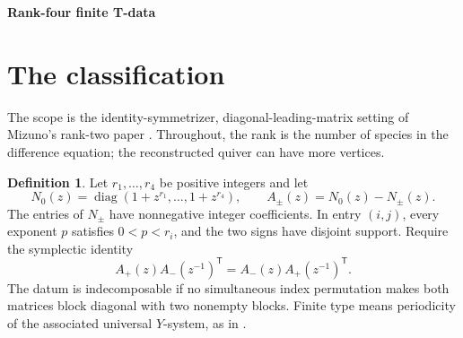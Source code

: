 \documentclass[11pt,a4paper]{article}
\theoremstyle{definition}
\newtheorem{definition}[theorem]{Definition}
\DeclareMathOperator{\diag}{diag}
\begin{document}
\thispagestyle{plain}
\begin{center}
{\LARGE\bfseries Rank-four finite T-data\par}
\vspace{4pt}{\large A computer-assisted classification\par}
\vspace{9pt}{\small 5 September 2026}
\end{center}
\begin{abstract}
With identity symmetrizer and diagonal leading matrix, there are thirty-seven
indecomposable rank-four families, up to rational rescaling of time, species
shifts, index permutations and sign exchange. We give explicit representatives,
their matrices at $z=1$, and exact periodicity certificates. A bound of $15$ on
off-diagonal coefficient sums reduces necessity to a finite enumeration,
followed by unbounded linear-arithmetic feasibility checks. A leading-term
obstruction excludes a remaining chain pattern. All surviving lift spaces
consist precisely of rescalings and shifts of their representatives.
\end{abstract}

\section{The classification}\label{sec:theorem}
The scope is the identity-symmetrizer, diagonal-leading-matrix setting of
Mizuno's rank-two paper \cite{Mizuno}. Throughout, the rank is the number of
species in the difference equation; the reconstructed quiver can have more
vertices.

\begin{definition}\label{def:datum}
Let $r_1,\ldots,r_4$ be positive integers and let
\[
 N_0(z)=\diag(1+z^{r_1},\ldots,1+z^{r_4}),\qquad
 A_\pm(z)=N_0(z)-N_\pm(z).
\]
The entries of $N_\pm$ have nonnegative integer coefficients. In entry $(i,j)$,
every exponent $p$ satisfies $0<p<r_i$, and the two signs have disjoint
support. Require the symplectic identity
\begin{equation}\label{eq:symplectic}
 A_+(z)A_-(z^{-1})^{\mathsf T}
 =A_-(z)A_+(z^{-1})^{\mathsf T}.
\end{equation}
The datum is indecomposable if no simultaneous index permutation makes both
matrices block diagonal with two nonempty blocks. Finite type means periodicity
of the associated universal $Y$-system, as in \cite[Definition 1.4]{Mizuno}.
\end{definition}
\end{document}
